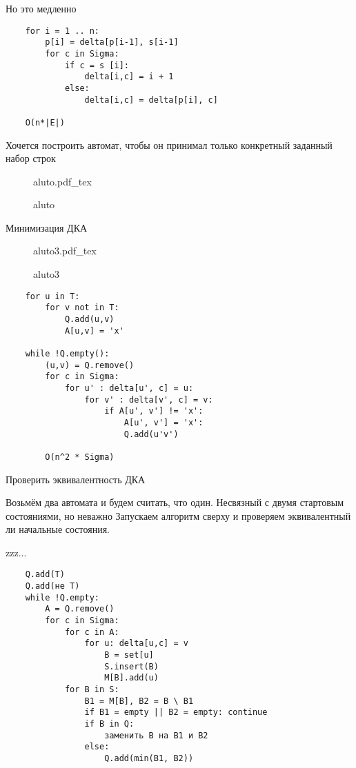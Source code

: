 \documentclass{book}
\theoremstyle{definition}
\newcommand{\incfig}[1]{%
    \def\svgwidth{\columnwidth}
    {#1.pdf_tex}
}
\begin{document}
Но это медленно

\begin{lstlisting}
    for i = 1 .. n:
        p[i] = delta[p[i-1], s[i-1]
        for c in Sigma:
            if c = s [i]:
                delta[i,c] = i + 1
            else:
                delta[i,c] = delta[p[i], c]

    O(n*|E|)
\end{lstlisting}

\begin{problem}
    Хочется построить автомат, чтобы он принимал только конкретный заданный набор строк
\end{problem}

\begin{figure}[!ht]
    \centering
    \incfig{aluto}
    \caption{aluto}
    \label{fig:aluto}
\end{figure}

Минимизация ДКА

\begin{figure}[!ht]
    \centering
    \incfig{aluto3}
    \caption{aluto3}
    \label{fig:aluto3}
\end{figure}

\begin{lstlisting}
    for u in T:
        for v not in T:
            Q.add(u,v)
            A[u,v] = 'x'

    while !Q.empty():
        (u,v) = Q.remove()
        for c in Sigma:
            for u' : delta[u', c] = u:
                for v' : delta[v', c] = v:
                    if A[u', v'] != 'x':
                        A[u', v'] = 'x':
                        Q.add(u'v')

        O(n^2 * Sigma)
\end{lstlisting}

\begin{problem}
    Проверить эквивалентность ДКА

    Возьмём два автомата и будем считать, что один. Несвязный с двумя стартовым состояниями, но неважно Запускаем алгоритм сверху и проверяем эквивалентный ли начальные состояния.
\end{problem}

zzz...

\begin{lstlisting}
    Q.add(T)
    Q.add(не T)
    while !Q.empty:
        A = Q.remove()
        for c in Sigma:
            for c in A:
                for u: delta[u,c] = v
                    B = set[u]
                    S.insert(B)
                    M[B].add(u)
            for B in S:
                B1 = M[B], B2 = B \ B1
                if B1 = empty || B2 = empty: continue
                if B in Q:
                    заменить B на B1 и B2
                else:
                    Q.add(min(B1, B2))
\end{lstlisting}
\end{document}
